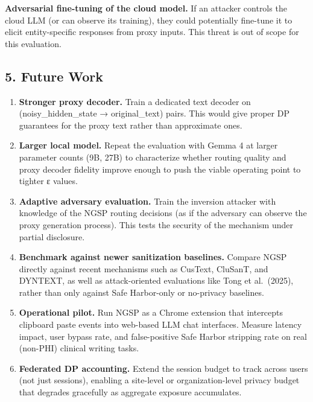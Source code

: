 \textbf{Adversarial fine-tuning of the cloud model.} If an attacker
controls the cloud LLM (or can observe its training), they could
potentially fine-tune it to elicit entity-specific responses from proxy
inputs. This threat is out of scope for this evaluation.

\subsection{5. Future Work}\label{future-work}

\begin{enumerate}
\def\labelenumi{\arabic{enumi}.}
\item
  \textbf{Stronger proxy decoder.} Train a dedicated text decoder on
  (noisy\_hidden\_state → original\_text) pairs. This would give proper
  DP guarantees for the proxy text rather than approximate ones.
\item
  \textbf{Larger local model.} Repeat the evaluation with Gemma 4 at
  larger parameter counts (9B, 27B) to characterize whether routing
  quality and proxy decoder fidelity improve enough to push the viable
  operating point to tighter ε values.
\item
  \textbf{Adaptive adversary evaluation.} Train the inversion attacker
  with knowledge of the NGSP routing decisions (as if the adversary can
  observe the proxy generation process). This tests the security of the
  mechanism under partial disclosure.
\item
  \textbf{Benchmark against newer sanitization baselines.} Compare NGSP
  directly against recent mechanisms such as CusText, CluSanT, and
  DYNTEXT, as well as attack-oriented evaluations like Tong et
  al.~(2025), rather than only against Safe Harbor-only or no-privacy
  baselines.
\item
  \textbf{Operational pilot.} Run NGSP as a Chrome extension that
  intercepts clipboard paste events into web-based LLM chat interfaces.
  Measure latency impact, user bypass rate, and false-positive Safe
  Harbor stripping rate on real (non-PHI) clinical writing tasks.
\item
  \textbf{Federated DP accounting.} Extend the session budget to track
  across users (not just sessions), enabling a site-level or
  organization-level privacy budget that degrades gracefully as
  aggregate exposure accumulates.
\end{enumerate}
